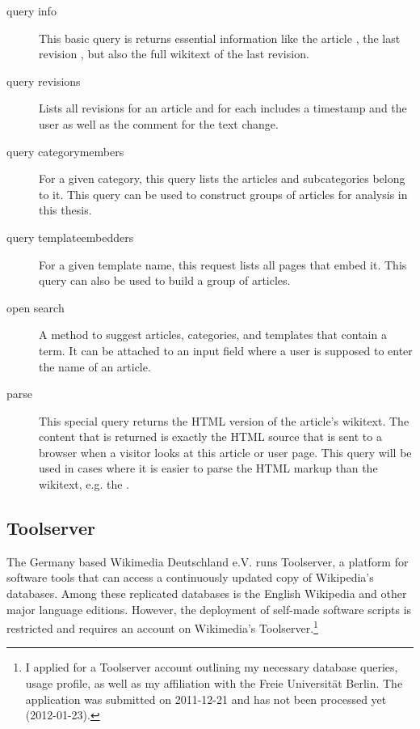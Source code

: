 \begin{description}
    \item[query info] This basic query is returns essential information like the article , the last revision , but also the full wikitext of the last revision.
    \item[query revisions] Lists all revisions for an article and for each includes a timestamp and the user as well as the comment for the text change.
    \item[query categorymembers] For a given category, this query lists the articles and subcategories belong to it.
    This query can be used to construct groups of articles for analysis in this thesis.
    \item[query templateembedders] For a given template name, this request lists all pages that embed it.
    This query can also be used to build a group of articles. 
    \item[open search] A method to suggest articles, categories, and templates that contain a term. 
    It can be attached to an input field where a user is supposed to enter the name of an article.
    \item[parse] This special query returns the \ac{HTML} version of the article's wikitext.
    The content that is returned is exactly the \ac{HTML} source that is sent to a browser when a visitor looks at this article or user page.
    This query will be used in cases where it is easier to parse the \ac{HTML} markup than the wikitext, e.g. the .
\end{description}

\subsection{Toolserver}\label{sub:toolserver}

The Germany based Wikimedia Deutschland e.V. runs Toolserver, a platform for software tools that can access a continuously updated copy of Wikipedia's databases. 
Among these replicated databases is the English Wikipedia and other major language editions.
However, the deployment of self-made software scripts is restricted and requires an account on Wikimedia's Toolserver.\footnote{I applied for a Toolserver account outlining my necessary database queries, usage profile, as well as my affiliation with the Freie Universit\"at Berlin. The application was submitted on 2011-12-21 and has not been processed yet (2012-01-23).}

